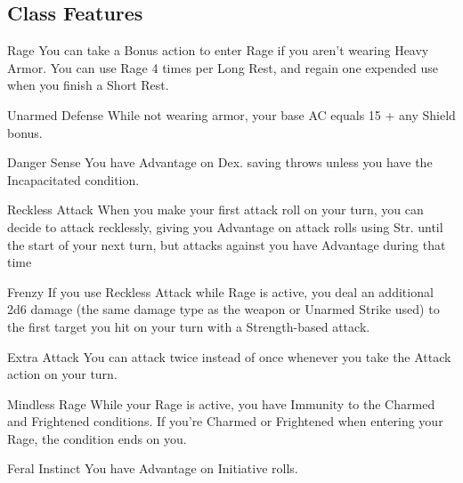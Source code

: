 \subsection {Class Features}
\begingroup
\DndSetThemeColor[PhbMauve]

\begin{DndComment}[]{Rage}
	You can take a Bonus action to enter Rage if you aren’t wearing Heavy Armor.
  You can use Rage 4 times per Long Rest, and regain one expended use when you finish a Short Rest.
\end{DndComment}


\begin{DndComment}[]{Unarmed Defense}
	While not wearing armor, your base AC equals 15 + any Shield bonus.
\end{DndComment}

\begin{DndComment}[]{Danger Sense}
	You have Advantage on Dex. saving throws unless you have the Incapacitated condition. 
\end{DndComment}

\begin{DndComment}[]{Reckless Attack}
	When you make your first attack roll on your turn, you can decide to attack recklessly, giving you Advantage on attack rolls using Str. until the start of your next turn, but attacks against you have Advantage during that time
\end{DndComment}


\begin{DndComment}[]{Frenzy}
	If you use Reckless Attack while Rage is active, you deal an additional 2d6 damage (the same damage type as the weapon or Unarmed Strike used) to the first target you hit on your turn with a Strength-based attack.
	
\end{DndComment}

\begin{DndComment}[]{Extra Attack}
	You can attack twice instead of once whenever you take the Attack action on your turn.
\end{DndComment}

\begin{DndComment}[]{Mindless Rage}
  While your Rage is active, you have Immunity to the Charmed and Frightened conditions. 
  If you’re Charmed or Frightened when entering your Rage, the condition ends on you.
\end{DndComment}

\begin{DndComment}[]{Feral Instinct}
  You have Advantage on Initiative rolls.
\end{DndComment}

